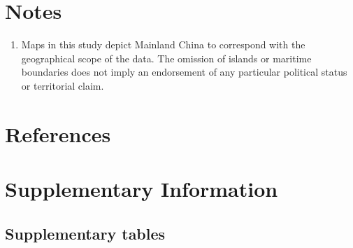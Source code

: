 \documentclass[
  letterpaper,
  twoside,
  twocolumn,
  9pt]{article}
\providecommand{\tightlist}{%
  \setlength{\itemsep}{0pt}\setlength{\parskip}{0pt}}\usepackage{longtable,booktabs,array}
\begin{document}
\section*{Notes}\label{notes}

\begin{enumerate}
\def\labelenumi{\arabic{enumi}.}
\tightlist
\item
  Maps in this study depict Mainland China to correspond with the
  geographical scope of the data. The omission of islands or maritime
  boundaries does not imply an endorsement of any particular political
  status or territorial claim.
\end{enumerate}

\section*{References}\label{references}

\renewcommand{\bibsection}{}


\label{ArticleLastPage}
\clearpage
\setcounter{page}{1}
\renewcommand{\thepage}{S\arabic{page}}
\renewcommand{\rscpagerange}{S1--\pageref*{LastPage}}
\onecolumn
{} %

\section*{Supplementary Information}\label{supplementary-information}

\setcounter{figure}{0}
\renewcommand{\thefigure}{S\arabic{figure}}
\setcounter{table}{0}
\renewcommand{\thetable}{S\arabic{table}}

\subsection*{Supplementary tables}\label{supplementary-tables}

\begingroup\fontsize{7}{9}\selectfont
\end{document}
